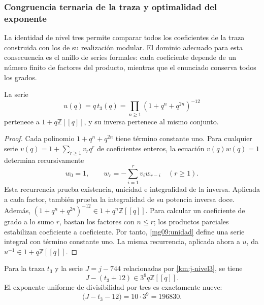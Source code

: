 \subsubsection{Congruencia ternaria de la traza y optimalidad del exponente}
\label{mg09:congruencia}

La identidad de nivel tres permite comparar todos los coeficientes
de la traza construida con los de su realización modular. El dominio
adecuado para esta consecuencia es el anillo de series formales: cada
coeficiente depende de un número finito de factores del producto,
mientras que el enunciado conserva todos los grados.

\begin{lemma}
La serie
\begin{equation}
 u(q)=q\,t_3(q)=\prod_{n\geq1}(1+q^n+q^{2n})^{-12}
 \label{mg09:unidad}
\end{equation}
pertenece a \(1+q\mathbb Z[[q]]\), y su inversa pertenece al
mismo conjunto.
\end{lemma}

\begin{proof}
Cada polinomio \(1+q^n+q^{2n}\) tiene término constante uno.
Para cualquier serie \(v(q)=1+\sum_{r\geq1}v_rq^r\) de
coeficientes enteros, la ecuación \(v(q)w(q)=1\) determina
recursivamente
\[
 w_0=1,\qquad w_r=-\sum_{i=1}^{r}v_iw_{r-i}\quad(r\geq1).
\]
Esta recurrencia prueba existencia, unicidad e integralidad de la
inversa. Aplicada a cada factor, también prueba la integralidad de su
potencia inversa doce. Además,
\((1+q^n+q^{2n})^{-12}\in1+q^n\mathbb Z[[q]]\).
Para calcular un coeficiente de grado a lo sumo \(r\), bastan los
factores con \(n\leq r\); los productos parciales estabilizan
coeficiente a coeficiente. Por tanto, \eqref{mg09:unidad} define
una serie integral con término constante uno. La misma recurrencia,
aplicada ahora a \(u\), da \(u^{-1}\in1+q\mathbb Z[[q]]\).
\end{proof}

\begin{proposition}
Para la traza \(t_3\) y la serie \(J=j-744\) relacionadas por
\eqref{km:j-nivel3}, se tiene
\begin{equation}
 J-(t_3+12)\in3^9q\mathbb Z[[q]].
 \label{mg09:congruencia-exacta}
\end{equation}
El exponente uniforme de divisibilidad por tres es exactamente nueve:
\begin{equation}
 [q]\bigl(J-t_3-12\bigr)=10\cdot3^9=196830.
 \label{mg09:optimalidad}
\end{equation}
\end{proposition}

